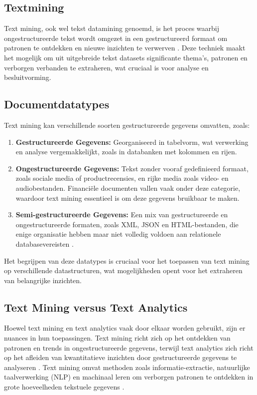 \subsection{Textmining}
Text mining, ook wel tekst datamining genoemd, is het proces waarbij ongestructureerde tekst wordt omgezet in een gestructureerd formaat om patronen te ontdekken en nieuwe inzichten te verwerven \autocite{IBM2024}. Deze techniek maakt het mogelijk om uit uitgebreide tekst datasets significante thema’s, patronen en verborgen verbanden te extraheren, wat cruciaal is voor analyse en besluitvorming.

\subsection{Documentdatatypes}

Text mining kan verschillende soorten gestructureerde gegevens omvatten, zoals:

\begin{enumerate}
    \item \textbf{Gestructureerde Gegevens:} Georganiseerd in tabelvorm, wat verwerking en analyse vergemakkelijkt, zoals in databanken met kolommen en rijen.
    \item \textbf{Ongestructureerde Gegevens:} Tekst zonder vooraf gedefinieerd formaat, zoals sociale media of productrecensies, en rijke media zoals video- en audiobestanden. Financiële documenten vallen vaak onder deze categorie, waardoor text mining essentieel is om deze gegevens bruikbaar te maken.
    \item \textbf{Semi-gestructureerde Gegevens:} Een mix van gestructureerde en ongestructureerde formaten, zoals XML, JSON en HTML-bestanden, die enige organisatie hebben maar niet volledig voldoen aan relationele databasevereisten \autocite{AWS2024}.
\end{enumerate}

Het begrijpen van deze datatypes is cruciaal voor het toepassen van text mining op verschillende datastructuren, wat mogelijkheden opent voor het extraheren van belangrijke inzichten.

\subsection{Text Mining versus Text Analytics}

Hoewel text mining en text analytics vaak door elkaar worden gebruikt, zijn er nuances in hun toepassingen. Text mining richt zich op het ontdekken van patronen en trends in ongestructureerde gegevens, terwijl text analytics zich richt op het afleiden van kwantitatieve inzichten door gestructureerde gegevens te analyseren \autocite{IBM2024}. Text mining omvat methoden zoals informatie-extractie, natuurlijke taalverwerking (NLP) en machinaal leren om verborgen patronen te ontdekken in grote hoeveelheden tekstuele gegevens \autocite{gaikwad2014text}.

